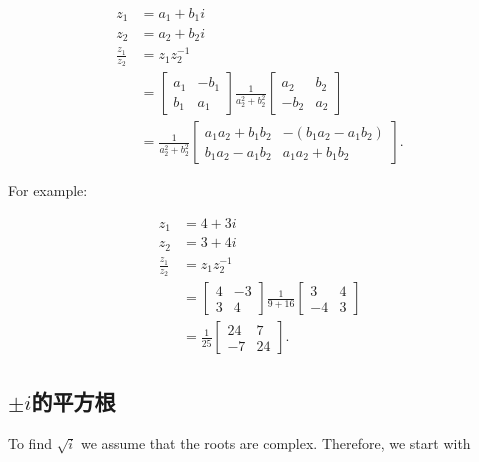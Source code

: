 $$
\begin{aligned}
z_{1} & =a_{1}+b_{1} i \\
z_{2} & =a_{2}+b_{2} i \\
\frac{z_{1}}{z_{2}} & =z_{1} z_{2}^{-1} \\
& =\left[\begin{array}{cc}
a_{1} & -b_{1} \\
b_{1} & a_{1}
\end{array}\right] \frac{1}{a_{2}^{2}+b_{2}^{2}}\left[\begin{array}{cc}
a_{2} & b_{2} \\
-b_{2} & a_{2}
\end{array}\right] \\
& =\frac{1}{a_{2}^{2}+b_{2}^{2}}\left[\begin{array}{cc}
a_{1} a_{2}+b_{1} b_{2} & -\left(b_{1} a_{2}-a_{1} b_{2}\right) \\
b_{1} a_{2}-a_{1} b_{2} & a_{1} a_{2}+b_{1} b_{2}
\end{array}\right] .
\end{aligned}
$$

For example:

$$
\begin{aligned}
z_{1} & =4+3 i \\
z_{2} & =3+4 i \\
\frac{z_{1}}{z_{2}} & =z_{1} z_{2}^{-1} \\
& =\left[\begin{array}{cc}
4 & -3 \\
3 & 4
\end{array}\right] \frac{1}{9+16}\left[\begin{array}{cc}
3 & 4 \\
-4 & 3
\end{array}\right] \\
& =\frac{1}{25}\left[\begin{array}{cc}
24 & 7 \\
-7 & 24
\end{array}\right] .
\end{aligned}
$$

\subsection{\boldmath $\pm i$的平方根}
To find $\sqrt{i}$ we assume that the roots are complex. Therefore, we start with

